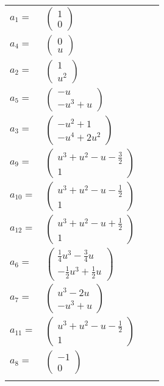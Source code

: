 \documentclass[1p]{elsarticle_modified}
\theoremstyle{definition}
\begin{document}
\begin{tabular}{m{7pt} m{180pt} m{7pt} m{180pt} }
\flushright $a_{1}=$&$\begin{pmatrix}1\\0\end{pmatrix}$ \\
\flushright $a_{4}=$&$\begin{pmatrix}0\\u\end{pmatrix}$ \\
\flushright $a_{2}=$&$\begin{pmatrix}1\\u^2\end{pmatrix}$ \\
\flushright $a_{5}=$&$\begin{pmatrix}- u\\- u^3+u\end{pmatrix}$ \\
\flushright $a_{3}=$&$\begin{pmatrix}- u^2+1\\- u^4+2 u^2\end{pmatrix}$ \\
\flushright $a_{9}=$&$\begin{pmatrix}u^3+u^2- u-\frac{3}{2}\\1\end{pmatrix}$ \\
\flushright $a_{10}=$&$\begin{pmatrix}u^3+u^2- u-\frac{1}{2}\\1\end{pmatrix}$ \\
\flushright $a_{12}=$&$\begin{pmatrix}u^3+u^2- u+\frac{1}{2}\\1\end{pmatrix}$ \\
\flushright $a_{6}=$&$\begin{pmatrix}\frac{1}{4} u^3-\frac{3}{4} u\\-\frac{1}{2} u^3+\frac{1}{2} u\end{pmatrix}$ \\
\flushright $a_{7}=$&$\begin{pmatrix}u^3-2 u\\- u^3+u\end{pmatrix}$ \\
\flushright $a_{11}=$&$\begin{pmatrix}u^3+u^2- u-\frac{1}{2}\\1\end{pmatrix}$ \\
\flushright $a_{8}=$&$\begin{pmatrix}-1\\0\end{pmatrix}$\\&\end{tabular}
\end{document}
